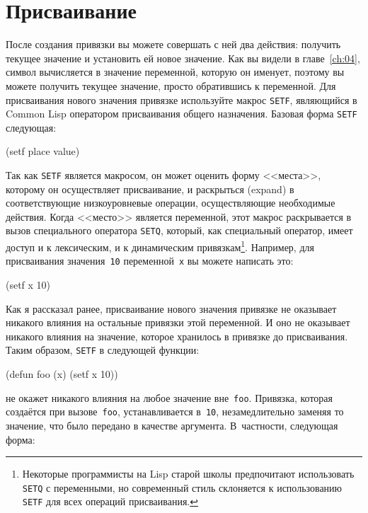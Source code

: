 \section{Присваивание}

После создания привязки вы можете совершать с ней два действия: получить текущее значение
и установить ей новое значение. Как вы видели в главе~\ref{ch:04}, символ вычисляется в
значение переменной, которую он именует, поэтому вы можете получить текущее значение,
просто обратившись к переменной. Для присваивания нового значения привязке используйте
макрос \lstinline{SETF}, являющийся в Common Lisp оператором присваивания общего назначения.
Базовая форма \lstinline{SETF} следующая:

\begin{myverb}
(setf place value)
\end{myverb}

Так как \lstinline{SETF} является макросом, он может оценить форму <<места>>, которому он
осуществляет присваивание, и раскрыться (expand) в соответствующие низкоуровневые
операции, осуществляющие необходимые действия. Когда <<место>> является переменной, этот
макрос раскрывается в вызов специального оператора \lstinline{SETQ}, который, как специальный
оператор, имеет доступ и к лексическим, и к динамическим привязкам\footnote{Некоторые
  программисты на Lisp старой школы предпочитают использовать \lstinline{SETQ} с переменными,
  но современный стиль склоняется к использованию \lstinline{SETF} для всех операций
  присваивания.}\hspace{\footnotenegspace}. Например, для присваивания значения~\lstinline{10} переменной~\lstinline{x} вы можете написать
это:

\begin{myverb}
(setf x 10)
\end{myverb}

Как я рассказал ранее, присваивание нового значения привязке не оказывает никакого влияния
на остальные привязки этой переменной. И оно не оказывает никакого влияния на значение,
которое хранилось в привязке до присваивания. Таким образом, \lstinline{SETF} в следующей
функции:

\begin{myverb}
(defun foo (x) (setf x 10))
\end{myverb}

\noindent{}не окажет никакого влияния на любое значение вне~\lstinline{foo}. Привязка, которая создаётся при
вызове~\lstinline{foo}, устанавливается в~\lstinline{10}, незамедлительно заменяя то значение, что было передано в
качестве аргумента. В~частности, следующая форма:

